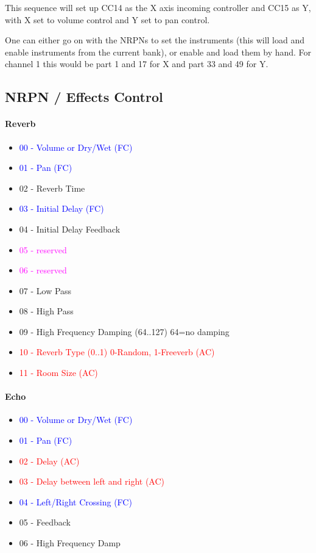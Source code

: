    This sequence will set up CC14 as the X axis incoming controller and CC15
   as Y, with X set to volume control and Y set to pan control.

   One can either go on with the NRPNs to set the instruments (this will load
   and enable instruments from the current bank), or enable and load
   them by hand.  For channel 1 this would be part 1 and 17 for X and part 33
   and 49 for Y.

\subsection{NRPN / Effects Control}
\label{subsection:nrpns_midi_nrpn_effects_control}

\paragraph{Reverb}

   \begin{itemize}
      \item \textcolor{blue}{00 - Volume or Dry/Wet (FC)}
      \item \textcolor{blue}{01 - Pan (FC)}
      \item 02 - Reverb Time
      \item \textcolor{blue}{03 - Initial Delay (FC)}
      \item 04 - Initial Delay Feedback
      \item \textcolor{magenta}{05 - reserved}
      \item \textcolor{magenta}{06 - reserved}
      \item 07 - Low Pass
      \item 08 - High Pass
      \item 09 - High Frequency Damping (64..127) 64=no damping
      \item \textcolor{red}{10 - Reverb Type (0..1) 0-Random, 1-Freeverb (AC)}
      \item \textcolor{red}{11 - Room Size (AC)}
   \end{itemize}

\paragraph{Echo}

   \begin{itemize}
      \item \textcolor{blue}{00 - Volume or Dry/Wet (FC)}
      \item \textcolor{blue}{01 - Pan (FC)}
      \item \textcolor{red}{02 - Delay (AC)}
      \item \textcolor{red}{03 - Delay between left and right (AC)}
      \item \textcolor{blue}{04 - Left/Right Crossing (FC)}
      \item 05 - Feedback
      \item 06 - High Frequency Damp
   \end{itemize}

